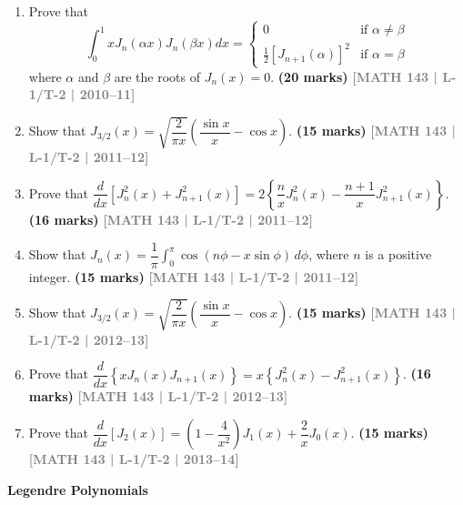 \documentclass[12pt,a4paper]{article}
\newcommand{\yr}[1]{\hfill\textcolor{gray}{\small\textbf{[#1]}}}
\newcommand{\mk}[1]{\textcolor{orange!70!black}{\small\textbf{(#1 marks)}}}
\newcommand{\subtopic}[2]{%
  \vspace{10pt}
  \noindent\begin{tcolorbox}[colback=#1!8,colframe=#1,boxrule=0.6pt,arc=4pt,
    left=6pt,right=6pt,top=4pt,bottom=4pt]
    \small\bfseries\textcolor{#1}{#2}
  \end{tcolorbox}
  \vspace{2pt}
}
\begin{document}
\begin{enumerate}

\item Prove that 
$$\int_{0}^{1} x J_{n}(\alpha x) J_{n}(\beta x) dx = \begin{cases} 0 & \text{if } \alpha \neq \beta \\ \frac{1}{2} [J_{n+1}(\alpha)]^2 & \text{if } \alpha = \beta \end{cases}$$
where $\alpha$ and $\beta$ are the roots of $J_{n}(x) = 0$.
\mk{20} \yr{MATH 143 | L-1/T-2 | 2010--11}

\item Show that $J_{3/2}(x)=\sqrt{\dfrac{2}{\pi x}}\left(\dfrac{\sin x}{x}-\cos x\right)$.
\mk{15} \yr{MATH 143 | L-1/T-2 | 2011--12}

\item Prove that $\dfrac{d}{dx}\left[J_{n}^{2}(x)+J_{n+1}^{2}(x)\right]=2\left\{\dfrac{n}{x}J_{n}^{2}(x)-\dfrac{n+1}{x}J_{n+1}^{2}(x)\right\}$.
\mk{16\textonehalf} \yr{MATH 143 | L-1/T-2 | 2011--12}

\item Show that $J_{n}(x)=\dfrac{1}{\pi}\displaystyle\int_{0}^{\pi}\cos(n\phi-x\sin\phi)\,d\phi$, where $n$ is a positive integer.
\mk{15} \yr{MATH 143 | L-1/T-2 | 2011--12}

\item Show that $J_{3/2}(x)=\sqrt{\dfrac{2}{\pi x}}\left(\dfrac{\sin x}{x}-\cos x\right)$.
\mk{15} \yr{MATH 143 | L-1/T-2 | 2012--13}

\item Prove that $\dfrac{d}{dx}\left\{xJ_{n}(x)J_{n+1}(x)\right\}=x\left\{J_{n}^{2}(x)-J_{n+1}^{2}(x)\right\}$.
\mk{16\textonehalf} \yr{MATH 143 | L-1/T-2 | 2012--13}

\item Prove that $\dfrac{d}{dx}\left[J_{2}(x)\right]=\left(1-\dfrac{4}{x^{2}}\right)J_{1}(x)+\dfrac{2}{x}J_{0}(x)$.
\mk{15} \yr{MATH 143 | L-1/T-2 | 2013--14}

\end{enumerate}

\subtopic{cI}{Legendre Polynomials}
\label{sub:s11-legendre}
\end{document}
